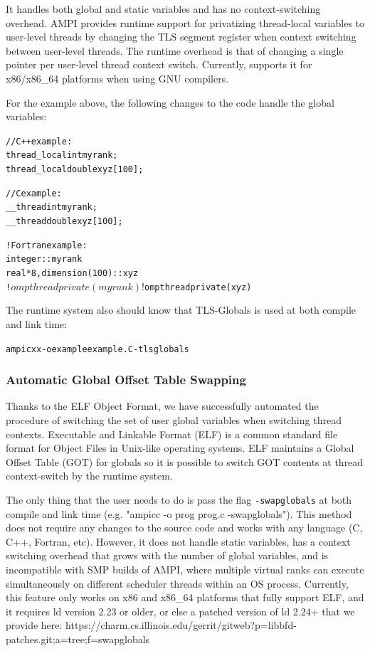 \documentclass[10pt]{article}
\begin{document}
It handles both global and static variables and has no context-switching
overhead. AMPI provides runtime support for privatizing thread-local variables to user-level threads
by changing the TLS segment register when context switching between user-level threads. The runtime
overhead is that of changing a single pointer per user-level thread context switch.
Currently, \charmpp{} supports it for x86/x86\_64 platforms when using GNU compilers.

For the example above, the following changes to the code handle the global variables:
\begin{alltt}
// C++ example:
thread_local int myrank;
thread_local double xyz[100];

// C example:
__thread int myrank;
__thread double xyz[100];

! Fortran example:
integer :: myrank
real*8, dimension(100) :: xyz
!$omp threadprivate(myrank)
!$omp threadprivate(xyz)
\end{alltt}

The runtime system also should know that TLS-Globals is used at both compile and link time:

\begin{alltt}
ampicxx -o example example.C -tlsglobals
\end{alltt}

\subsubsection{Automatic Global Offset Table Swapping}
Thanks to the ELF Object Format, we have successfully automated the procedure 
of switching the set of user global variables when switching thread contexts.
Executable and Linkable Format (ELF) is a common standard file format 
for Object Files in Unix-like operating systems.
ELF maintains a Global Offset Table (GOT) for globals so it is possible to
switch GOT contents at thread context-switch by the runtime system.

The only thing that the user needs to do is pass the flag {\tt -swapglobals}
at both compile and link time (e.g. "ampicc -o prog prog.c -swapglobals"). This method does not require
any changes to the source code and works with any language (C, C++, Fortran, etc).
However, it does not handle static variables, has a context switching
overhead that grows with the number of global variables, and is incompatible with SMP builds
of AMPI, where multiple virtual ranks can execute simultaneously on different scheduler threads
within an OS process.
Currently, this feature only works on x86 and x86\_64 platforms that fully support ELF,
and it requires ld version 2.23 or older, or else a patched version of ld 2.24+ that we provide
here: https://charm.cs.illinois.edu/gerrit/gitweb?p=libbfd-patches.git;a=tree;f=swapglobals
\end{document}
